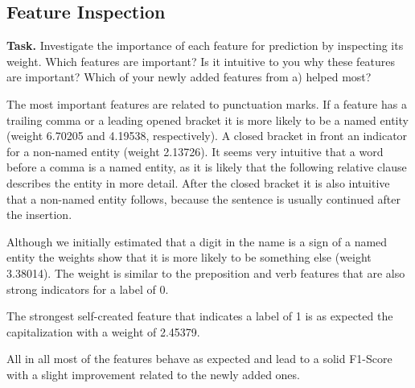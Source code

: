 \documentclass{support/acm_proc_article-sp}
\begin{document}
    \subsection{Feature Inspection}

    \textbf{Task.} Investigate the importance of each feature for prediction by inspecting its weight.
    Which features are important?
    Is it intuitive to you why these features are important?
    Which of your newly added features from a) helped most?

    The most important features are related to punctuation marks.
    If a feature has a trailing comma or a leading opened bracket it is more likely to be a named entity (weight 6.70205
    and 4.19538, respectively).
    A closed bracket in front an indicator for a non-named entity (weight 2.13726).
    It seems very intuitive that a word before a comma is a named entity, as it is likely that the following relative clause
    describes the entity in more detail.
    After the closed bracket it is also intuitive that a non-named entity follows, because the sentence is usually
    continued after the insertion.

    Although we initially estimated that a digit in the name is a sign of a named entity the weights show that it is more
    likely to be something else (weight 3.38014).
    The weight is similar to the preposition and verb features that are also strong indicators for a label of 0.

    The strongest self-created feature that indicates a label of 1 is as expected the capitalization with a weight of 2.45379.

    All in all most of the features behave as expected and lead to a solid F1-Score with a slight improvement related to
    the newly added ones.


    
    
\end{document}
